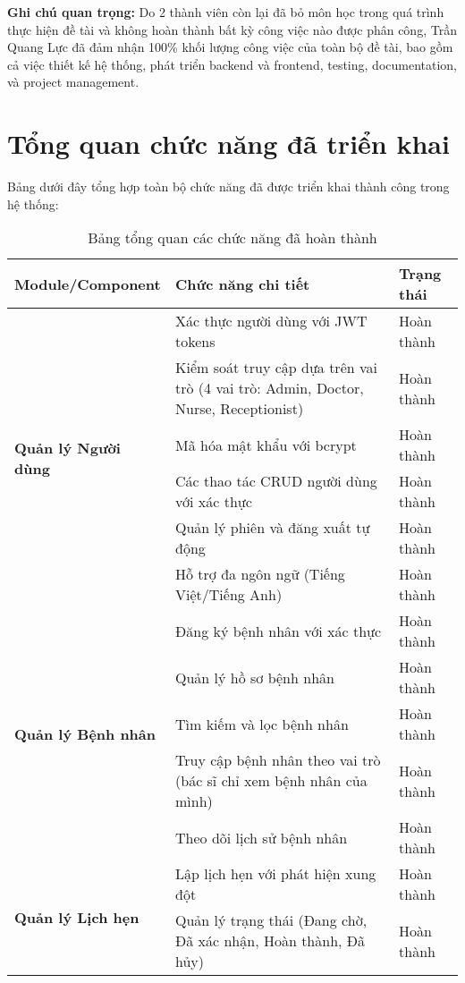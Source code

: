 \documentclass[12pt,a4paper]{report}
\begin{document}
\textbf{Ghi chú quan trọng:} Do 2 thành viên còn lại đã bỏ môn học trong quá trình thực hiện đề tài và không hoàn thành bất kỳ công việc nào được phân công, Trần Quang Lực đã đảm nhận 100\% khối lượng công việc của toàn bộ đề tài, bao gồm cả việc thiết kế hệ thống, phát triển backend và frontend, testing, documentation, và project management.

\section{Tổng quan chức năng đã triển khai}

Bảng dưới đây tổng hợp toàn bộ chức năng đã được triển khai thành công trong hệ thống:

\begin{table}[H]
\centering
\caption{Bảng tổng quan các chức năng đã hoàn thành}
\begin{tabular}{|p{4cm}|p{8cm}|p{2.5cm}|}
\hline
\textbf{Module/Component} & \textbf{Chức năng chi tiết} & \textbf{Trạng thái} \\
\hline
\multirow{6}{4cm}{\textbf{Quản lý Người dùng}} & 
Xác thực người dùng với JWT tokens & Hoàn thành \\
\cline{2-3}
& Kiểm soát truy cập dựa trên vai trò (4 vai trò: Admin, Doctor, Nurse, Receptionist) & Hoàn thành \\
\cline{2-3}
& Mã hóa mật khẩu với bcrypt & Hoàn thành \\
\cline{2-3}
& Các thao tác CRUD người dùng với xác thực & Hoàn thành \\
\cline{2-3}
& Quản lý phiên và đăng xuất tự động & Hoàn thành \\
\cline{2-3}
& Hỗ trợ đa ngôn ngữ (Tiếng Việt/Tiếng Anh) & Hoàn thành \\
\hline
\multirow{5}{4cm}{\textbf{Quản lý Bệnh nhân}} & Đăng ký bệnh nhân với xác thực & Hoàn thành \\
\cline{2-3}
& Quản lý hồ sơ bệnh nhân & Hoàn thành \\
\cline{2-3}
& Tìm kiếm và lọc bệnh nhân & Hoàn thành \\
\cline{2-3}
& Truy cập bệnh nhân theo vai trò (bác sĩ chỉ xem bệnh nhân của mình) & Hoàn thành \\
\cline{2-3}
& Theo dõi lịch sử bệnh nhân & Hoàn thành \\
\hline
\multirow{5}{4cm}{\textbf{Quản lý Lịch hẹn}} & Lập lịch hẹn với phát hiện xung đột & Hoàn thành \\
\cline{2-3}
& Quản lý trạng thái (Đang chờ, Đã xác nhận, Hoàn thành, Đã hủy) & Hoàn thành \\

\end{tabular}
\end{table}
\end{document}
